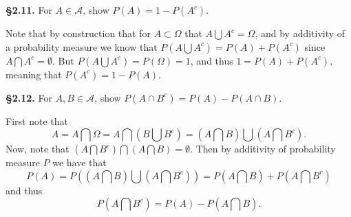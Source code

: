 \documentclass[11pt,reqno]{amsart}
\newcommand{\tbox}[2]{\begin{tcolorbox}[colback=white, sharp corners]\textbf{\S#1.} #2 \end{tcolorbox}}
\begin{document}
\tbox{2.11}{ 
    For $A \in \mathcal{A}$, show $P(A) = 1 - P(A^c)$.
}
Note that by construction that for $A \subset \Omega$ that $A \bigcup A^c= \Omega$, and by additivity of a probability measure we know that $P(A\bigcup A^c)=P(A)+P(A^c)$ since $A \bigcap A^c= \emptyset$. 
But $P(A\bigcup A^c) = P(\Omega) = 1$, and thus $1 = P(A) + P(A^c)$, meaning that $P(A^c) = 1 - P(A)$.

\tbox{2.12}{
For $A,B \in \mathcal{A}$, show $P(A \cap B^c) = P(A)-P(A \cap B)$.
}
First note that
$$
    A = A \bigcap \Omega =A\bigcap (B\bigcup B^c)=(A\bigcap B) \bigcup (A\bigcap B^c).
$$ 
Now, note that $(A\bigcap B^c) \bigcap (A\bigcap B) = \emptyset$. 
Then by additivity of probability measure $P$ we have that 
$$
P(A)=P((A\bigcap B) \bigcup (A \bigcap B^c))=P(A \bigcap B) + P( A\bigcap B^c)
$$
and thus 
$$
P(A \bigcap B^c) = P(A)-P(A \bigcap B).
$$
\end{document}
